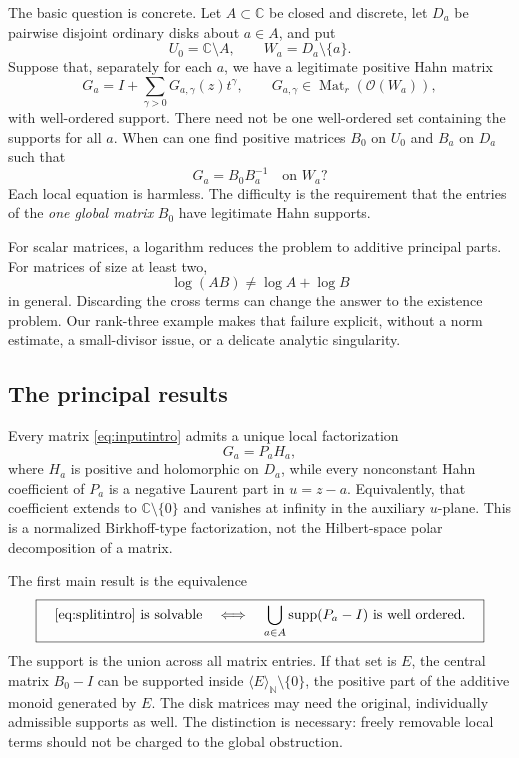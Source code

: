 \documentclass[11pt,letterpaper]{article}
\theoremstyle{definition}
\theoremstyle{remark}
\newcommand{\C}{\mathbb C}
\newcommand{\N}{\mathbb N}
\newcommand{\OO}{\mathcal O}
\newcommand{\Mat}{\operatorname{Mat}}
\newcommand{\supp}{\operatorname{supp}}
\newcommand{\angles}[1]{\langle #1\rangle_{\N}}
\numberwithin{equation}{section}
\begin{document}
The basic question is concrete. Let $A\subset\C$ be closed and discrete, let $D_a$ be pairwise disjoint ordinary disks about $a\in A$, and put
\[
 U_0=\C\setminus A,\qquad W_a=D_a\setminus\{a\}.
\]
Suppose that, separately for each $a$, we have a legitimate positive Hahn matrix
\begin{equation}\label{eq:inputintro}
 G_a=I+\sum_{\gamma>0}G_{a,\gamma}(z)t^\gamma,
 \qquad G_{a,\gamma}\in\Mat_r(\OO(W_a)),
\end{equation}
with well-ordered support. There need not be one well-ordered set containing the supports for all $a$. When can one find positive matrices $B_0$ on $U_0$ and $B_a$ on $D_a$ such that
\begin{equation}\label{eq:splitintro}
 G_a=B_0B_a^{-1}\quad\text{on }W_a?
\end{equation}
Each local equation is harmless. The difficulty is the requirement that the entries of the \emph{one global matrix} $B_0$ have legitimate Hahn supports.

For scalar matrices, a logarithm reduces the problem to additive principal parts. For matrices of size at least two,
\[
 \log(AB)\ne\log A+\log B
\]
in general. Discarding the cross terms can change the answer to the existence problem. Our rank-three example makes that failure explicit, without a norm estimate, a small-divisor issue, or a delicate analytic singularity.

\subsection{The principal results}

Every matrix \eqref{eq:inputintro} admits a unique local factorization
\begin{equation}\label{eq:factorintro}
 G_a=P_aH_a,
\end{equation}
where $H_a$ is positive and holomorphic on $D_a$, while every nonconstant Hahn coefficient of $P_a$ is a negative Laurent part in $u=z-a$. Equivalently, that coefficient extends to $\C\setminus\{0\}$ and vanishes at infinity in the auxiliary $u$-plane. This is a normalized Birkhoff-type factorization, not the Hilbert-space polar decomposition of a matrix.

The first main result is the equivalence
\begin{equation}\label{eq:criterionintro}
 \boxed{\quad
 \eqref{eq:splitintro}\text{ is solvable}
 \quad\Longleftrightarrow\quad
 \bigcup_{a\in A}\supp(P_a-I)\text{ is well ordered}.
 \quad}
\end{equation}
The support is the union across all matrix entries. If that set is $E$, the central matrix $B_0-I$ can be supported inside $\angles E\setminus\{0\}$, the positive part of the additive monoid generated by $E$. The disk matrices may need the original, individually admissible supports as well. The distinction is necessary: freely removable local terms should not be charged to the global obstruction.
\end{document}
